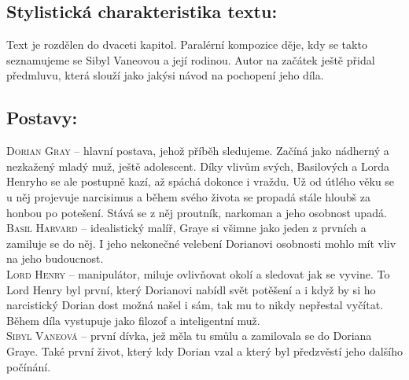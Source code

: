 \documentclass{extarticle} %
\begin{document}


\subsection*{Stylistická charakteristika textu:}
\noindent 
Text je rozdělen do dvaceti kapitol.
Paralérní kompozice děje, kdy se takto seznamujeme se Sibyl Vaneovou a její rodinou.
Autor na začátek ještě přidal předmluvu, která slouží jako jakýsi návod na pochopení jeho díla.

\subsection*{Postavy:}
\noindent 
\textsc{Dorian Gray --} hlavní postava, jehož příběh sledujeme. Začíná jako nádherný a nezkažený mladý muž, ještě adolescent. Díky vlivům svých, Basilových a Lorda Henryho se ale postupně kazí, až spáchá dokonce i vraždu.
Už od útlého věku se u něj projevuje narcisimus a během svého života se propadá stále hloubš za honbou po potešení.
Stává se z něj proutník, narkoman a jeho osobnost upadá. \\
\textsc{Basil Harvard --} idealistický malíř, Graye si všimne jako jeden z prvních a zamiluje se do něj.
I jeho nekonečné velebení Dorianovi osobnosti mohlo mít vliv na jeho budoucnost. \\
\textsc{Lord Henry --} manipulátor, miluje ovlivňovat okolí a sledovat jak se vyvine.
To Lord Henry byl první, který Dorianovi nabídl svět potěšení a i když by si ho narcistický Dorian dost možná našel i sám, tak mu to nikdy nepřestal vyčítat.
Během díla vystupuje jako filozof a inteligentní muž. \\
\textsc{Sibyl Vaneová --} první dívka, jež měla tu smůlu a zamilovala se do Doriana Graye. Také první život, který kdy Dorian vzal a který byl předzvěstí jeho dalšího počínání.
\end{document}
